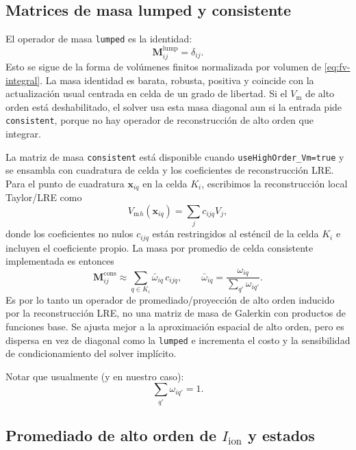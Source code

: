 \documentclass[11pt,a4paper]{article}
\newcommand{\code}[1]{\texttt{\small #1}}
\newcommand{\Vm}{V_{\text{m}}}
\newcommand{\Iion}{I_{\mathrm{ion}}}
\newcommand{\Mmass}{\mathbf{M}}
\begin{document}
\subsection{Matrices de masa lumped y consistente}

El operador de masa \code{lumped} es la identidad:
\begin{equation}
  \Mmass^{\mathrm{lump}}_{ij}
  =
  \delta_{ij}.
  \label{eq:lumped}
\end{equation}
Esto se sigue de la forma de volúmenes finitos normalizada por volumen de
\eqref{eq:fv-integral}. La masa identidad es barata, robusta, positiva y coincide con la actualización usual centrada
en celda de un grado de libertad. Si el $\Vm$ de alto orden está deshabilitado, el solver
usa esta masa diagonal aun si la entrada pide \code{consistent}, porque no hay operador de
reconstrucción de alto orden que integrar.

La matriz de masa \code{consistent} está disponible cuando \code{useHighOrder\_Vm=true} y se
ensambla con cuadratura de celda y los coeficientes de reconstrucción LRE. Para el punto de
cuadratura $\mathbf{x}_{iq}$ en la celda $K_i$, escribimos la reconstrucción local
Taylor/LRE como
\begin{equation}
  \Vm{}_{h}(\mathbf{x}_{iq})
  =
  \sum_j c_{ijq} V_j ,
\end{equation}
donde los coeficientes no nulos $c_{ijq}$ están restringidos al esténcil de la celda $K_i$ e
incluyen el coeficiente propio. La masa por promedio de celda consistente implementada es
entonces
\begin{equation}
  \Mmass^{\mathrm{cons}}_{ij}
  \approx
  \sum_{q\in K_i}
  \bar{\omega}_{iq}\,c_{ijq},
  \qquad
  \bar{\omega}_{iq}
  =
  \frac{\omega_{iq}}{\sum_{q'}\omega_{iq'}}.
  \label{eq:consistent}
\end{equation}
Es por lo tanto un operador de promediado/proyección de alto orden inducido por la
reconstrucción LRE, no una matriz de masa de Galerkin con productos de funciones base. Se
ajusta mejor a la aproximación espacial de alto orden, pero es dispersa en vez de diagonal como la \code{lumped} e
incrementa el costo y la sensibilidad de condicionamiento del solver implícito.

Notar que usualmente (y en nuestro caso):
%
\begin{equation}
\sum_{q'}\omega_{iq'}=1.
\end{equation}

\subsection{Promediado de alto orden de \texorpdfstring{$\Iion$}{Iion} y estados}
\label{sec:iion-quad}
\end{document}
